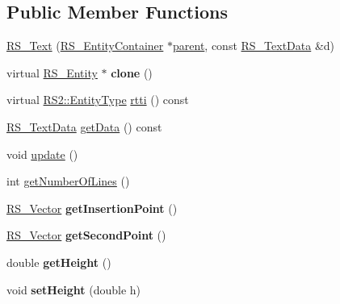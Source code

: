 \subsection*{Public Member Functions}
\begin{DoxyCompactItemize}
\item 
\hyperlink{classRS__Text_aa2bf70217cca46b180374da0e5b235f0}{R\-S\-\_\-\-Text} (\hyperlink{classRS__EntityContainer}{R\-S\-\_\-\-Entity\-Container} $\ast$\hyperlink{classRS__Entity_a80358a8d2fc6739a516a278dc500b49f}{parent}, const \hyperlink{classRS__TextData}{R\-S\-\_\-\-Text\-Data} \&d)
\item 
\hypertarget{classRS__Text_a548bb06a4eff1696d58fba6e5869ca1e}{virtual \hyperlink{classRS__Entity}{R\-S\-\_\-\-Entity} $\ast$ {\bfseries clone} ()}\label{classRS__Text_a548bb06a4eff1696d58fba6e5869ca1e}

\item 
virtual \hyperlink{classRS2_a8f26d1b981e1e85cff16738b43337e6a}{R\-S2\-::\-Entity\-Type} \hyperlink{classRS__Text_ad40f267fb7a572b46a87464088c53bfa}{rtti} () const 
\item 
\hyperlink{classRS__TextData}{R\-S\-\_\-\-Text\-Data} \hyperlink{classRS__Text_a405ebcbee8790958ec4f185dee68ceb6}{get\-Data} () const 
\item 
void \hyperlink{classRS__Text_a67d067700252ffa99793f72431576dbd}{update} ()
\item 
int \hyperlink{classRS__Text_a517f6bec0148d8e3d5832b73dd151ef8}{get\-Number\-Of\-Lines} ()
\item 
\hypertarget{classRS__Text_a1d3725848721853139837f47bbaddd1c}{\hyperlink{classRS__Vector}{R\-S\-\_\-\-Vector} {\bfseries get\-Insertion\-Point} ()}\label{classRS__Text_a1d3725848721853139837f47bbaddd1c}

\item 
\hypertarget{classRS__Text_a5b2319b63a0380f698de418bff64d8d2}{\hyperlink{classRS__Vector}{R\-S\-\_\-\-Vector} {\bfseries get\-Second\-Point} ()}\label{classRS__Text_a5b2319b63a0380f698de418bff64d8d2}

\item 
\hypertarget{classRS__Text_aa75899b41e5d6e87a9f56594b0df1f56}{double {\bfseries get\-Height} ()}\label{classRS__Text_aa75899b41e5d6e87a9f56594b0df1f56}

\item 
\hypertarget{classRS__Text_a4a4357899cb27617b99ee74e86304870}{void {\bfseries set\-Height} (double h)}\label{classRS__Text_a4a4357899cb27617b99ee74e86304870}


\end{DoxyCompactItemize}
